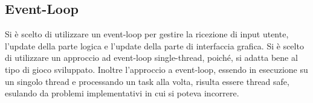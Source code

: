 \subsection{Event-Loop}
Si è scelto di utilizzare un event-loop per gestire la ricezione di input utente, l'update della parte logica e l'update della parte di interfaccia grafica. 
Si è scelto di utilizzare un approccio ad event-loop single-thread, poiché, si adatta bene al tipo di gioco sviluppato. Inoltre l'approccio a event-loop, essendo in esecuzione su un singolo thread e processando un task alla volta, risulta essere thread safe, esulando da problemi implementativi in cui si poteva incorrere.


